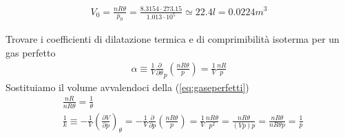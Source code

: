 \documentclass[
10pt, %
a4paper, %
oneside, %
headinclude,footinclude, %
BCOR5mm, %
]{scrartcl}
\begin{document}
\begin{align*} 
	V_0 = \frac{n R \theta}{p_0} = \frac{8.3154\cdot 273.15}{1.013\cdot 10^{5}}\simeq 22.4 l = 0.0224 m^3
\end{align*} 
\begin{exercise}
	Trovare i coefficienti di dilatazione termica e di comprimibilità isoterma per un gas perfetto
	\begin{align*} 
		\alpha \equiv \frac{1}{V}\frac{\partial}{\partial\theta}_p(\frac{n R \theta}{p}) = \frac{1}{V}\frac{n R}{p}
	\end{align*} 
	Sostituiamo il volume avvalendoci della (\ref{eq:gaseperfetti})
	\begin{align*} 
		&\frac{n R}{n R \theta} = \frac{1}{\theta}\\
		&\frac{1}{k} \equiv -\frac{1}{V}(\frac{\partial V}{\partial p})_{\theta} = -\frac{1}{V}\frac{\partial}{\partial p}(\frac{n R \theta}{p})= \frac{1}{V}\frac{n R \theta}{p^2} = \frac{n R \theta}{(Vp) p} = \frac{n R \theta}{n R \theta p} = \frac{1}{p}
	\end{align*} 
\end{exercise} 
\end{document}
